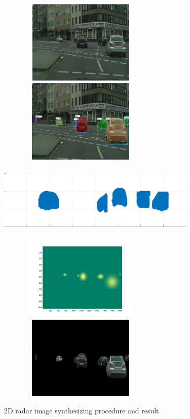 \begin{figure}
	\centering
	\includegraphics[width=8cm,height=4cm]{./figure/2d_origin.jpg}\\
	\includegraphics[width=8cm,height=4cm]{./figure/2d_detect.jpg}\\
	\includegraphics[width=9.5cm,height=4cm]{./figure/3d_cam.jpg}\\
	\includegraphics[width=8cm,height=4cm]{./figure/2d_blur.jpg}\\
	\includegraphics[width=8cm,height=4cm]{./figure/2d_select.jpg}\\
	\caption{2D radar image synthesizing procedure and result}
	\label{2D_synth}
\end{figure}


